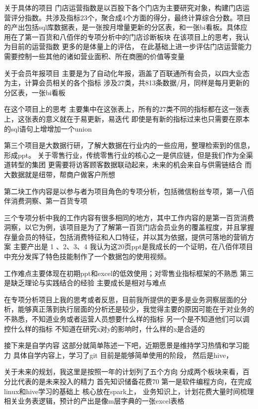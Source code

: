 \documentclass[a4paper]{article}
\begin{document}
关于具体的项目 门店运营指数是以百股下各个门店为主要研究对象，构建门店运营评分指数。共涉及指标23个，聚合成4个方面的得分，最终计算综合分数。项目的产出包括sql库数据表，是一张按月增量更新的分区表，和一张bi看板。具体应用在了第一百货和八佰伴的专项分析中的门店诊断板块
在该项目上的思考，我认为目前的运营指数 更多的是体量上的评估，
在此基础上进一步评估门店运营能力需要控制一些其他的诸如营业面积、所在商圈的价值等变量

关于会员年报项目 主要是为了自动化年报，涵盖了百联通所有会员，以四大业态为主，计算会员相关的各个指标 涉及27类，共813条数据/月，同样是每月更新的分区表，一张bi看板

在这个项目上的思考 主要集中在这张表上，所有的27类不同的指标都在这一张表上，这张表的意义就在于易更新，易迭代 即使是有新的指标过来也只需要在原本的sql语句上增增加一个union

	
第三个项目是大数据行研，了解大数据在行业内的一些应用，整理检索到的信息，形成ppt。
关于零售行业，传统零售行业的核心之一是供应链，但是我们作为全渠道转型的集团 更需要将访客顾客数据联动起来，未来的机会来自与供需链结合 而大数据就是纽带，帮商户做客户所想


第二块工作内容是以参与者为项目角色的专项分析，包括微信粉丝专项，第一八佰伴消费洞察、第一百货专项

三个专项分析中我的工作内容有很多相同的地方，其中工作内容的是第一百货消费洞察，以它为例，该项目是为了了解第一百货门店会员业务的覆盖程度，并且掌握存量会员的特征，包括消费特征和人口特征，并以其为依据，提供可落地的营销方案
主要产出是  1 、2、3、4
我认为这20页ppt是我成长的一个证明，在八佰伴项目中充分发挥了特色技能制作了一个数据包的使用视频。

工作难点主要体现在初期ppt和excel的低效使用；对零售业指标框架的不熟悉
第三是缺乏理论与实践结合的经验
主要成长是相对与难点

在专项分析项目上我的思考或者反思，目前我所提供的更多是业务洞察层面的分析，能够真正落到执行层面的分析还是较少，我觉得主要的原因可能在于对业务的不熟悉，不知道业务或者运营人员想要什么样的指标 另一个是不知道他们可以调控什么样的指标
不知道在研究x对y的影响时，什么样的x是合适的

接下来是自学内容 这部分就简单陈述一下吧，近期愿景是维持学习热情和学习能力
具体自学内容上，学习了git 目前是能够简单使用的阶段，
然后是hive，



关于未来的规划，我这里是按照一年的计划列了五个方向 分成两个板块来看，百分比代表的是未来投入的精力
首先知识储备花费70%
第一是软件编程方向，在完成linux和hive学习的基础上 核心放在spark上，
业务知识上，计划花费大量时间梳理相关业务表逻辑，预计的产出是像m层字典的一张excel表格
                                                                   
\end{document}
